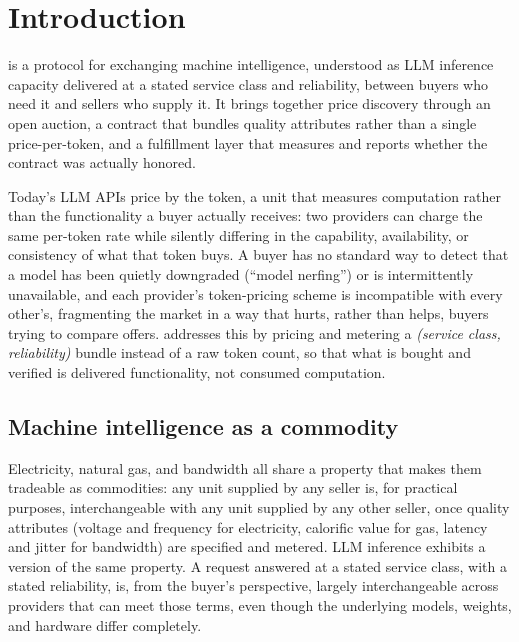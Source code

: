 \maketitle

\setcounter{tocdepth}{2}
\tableofcontents

\section{Introduction}
\label{sec:introduction}

\Noesis{} is a protocol for exchanging machine intelligence, understood as LLM
inference capacity delivered at a stated service class and reliability,
between buyers who need it and sellers who supply it. It brings together
price discovery through an open auction, a contract that bundles quality
attributes rather than a single price-per-token, and a fulfillment layer that
measures and reports whether the contract was actually honored.

Today's LLM APIs price by the token, a unit that measures computation rather
than the functionality a buyer actually receives: two providers can charge
the same per-token rate while silently differing in the capability,
availability, or consistency of what that token buys. A buyer has no
standard way to detect that a model has been quietly downgraded (``model
nerfing'') or is intermittently unavailable, and each provider's
token-pricing scheme is incompatible with every other's, fragmenting the
market in a way that hurts, rather than helps, buyers trying to compare
offers. \Noesis{} addresses this by pricing and metering a \emph{(service class,
reliability)} bundle instead of a raw token count, so that what is
bought and verified is delivered functionality, not consumed computation.

\subsection{Machine intelligence as a commodity}
\label{sec:intelligence_as_commodity}

Electricity, natural gas, and bandwidth all share a property that makes them
tradeable as commodities: any unit supplied by any seller is, for practical
purposes, interchangeable with any unit supplied by any other seller, once
quality attributes (voltage and frequency for electricity, calorific value for
gas, latency and jitter for bandwidth) are specified and metered. LLM inference
exhibits a version of the same property. A request answered at a stated
service class, with a stated reliability, is,
from the buyer's perspective, largely interchangeable across providers that can
meet those terms, even though the underlying models, weights, and hardware
differ completely.

